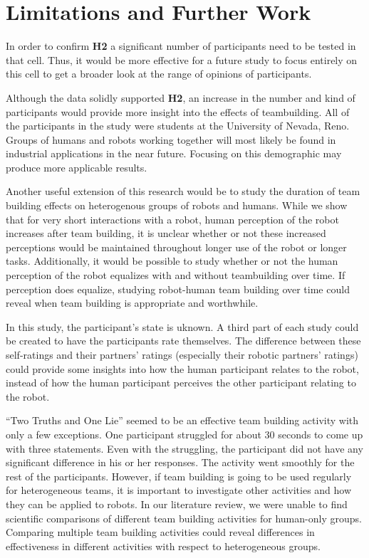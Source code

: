 \documentclass{acm_proc_article-sp}
\begin{document}
\section{Limitations and Further Work}
\label{section:limitations-and-further-work}
In order to confirm \textbf{H2} a significant number of participants need to be tested in that cell. Thus, it would be more effective for a future study to focus entirely on this cell to get a broader look at the range of opinions of participants.

Although the data solidly supported \textbf{H2}, an increase in the number and kind of participants would provide more insight into the effects of teambuilding. All of the participants in the study were students at the University of Nevada, Reno. Groups of humans and robots working together will most likely be found in industrial applications in the near future. Focusing on this demographic may produce more applicable results. 

Another useful extension of this research would be to study the duration of team building effects on heterogenous groups of robots and humans. While we show that for very short interactions with a robot, human perception of the robot increases after team building, it is unclear whether or not these increased perceptions would be maintained throughout longer use of the robot or longer tasks. Additionally, it would be possible to study whether or not the human perception of the robot equalizes with and without teambuilding over time. If perception does equalize, studying robot-human team building over time could reveal when team building is appropriate and worthwhile. 

In this study, the participant's state is uknown. A third part of each study could be created to have the participants rate themselves. The difference between these self-ratings and their partners' ratings (especially their robotic partners' ratings) could provide some insights into how the human participant relates to the robot, instead of how the human participant perceives the other participant relating to the robot. 

``Two Truths and One Lie'' seemed to be an effective team building activity with only a few exceptions. One participant struggled for about 30 seconds to come up with three statements. Even with the struggling, the participant did not have any significant difference in his or her responses. The activity went smoothly for the rest of the participants. However, if team building is going to be used regularly for heterogeneous teams, it is important to investigate other activities and how they can be applied to robots. In our literature review, we were unable to find scientific comparisons of different team building activities for human-only groups. Comparing multiple team building activities could reveal differences in effectiveness in different activities with respect to heterogeneous groups.
\end{document}
